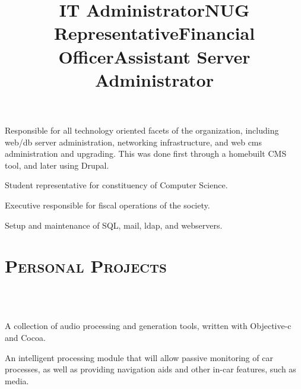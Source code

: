 \begin{resume}
\title{IT Administrator}
\begin{position}
Responsible for all technology oriented facets of the organization, including web/db server administration, networking infrastructure, and web cms administration and upgrading. This was done first through a homebuilt CMS tool, and later using Drupal.
\end{position}

\title{NUG Representative}
\begin{position}
Student representative for constituency of Computer Science.
\end{position}

\title{Financial Officer}
\begin{position}
Executive responsible for fiscal operations of the society. 
\end{position}

\title{Assistant Server Administrator }
\begin{position}
Setup and maintenance of SQL, mail, ldap, and webservers.
\end{position}



\section{\textsc{Personal Projects}}
\begin{formatb}
	\\
	\body\\
\end{formatb}

\begin{position}
	A collection of audio processing and generation tools, written with Objective-c and Cocoa.
\end{position}

\begin{position}
	An intelligent processing module that will allow passive monitoring of car processes, as well as providing navigation aids and other in-car features, such as media.
\end{position}


\end{resume}
